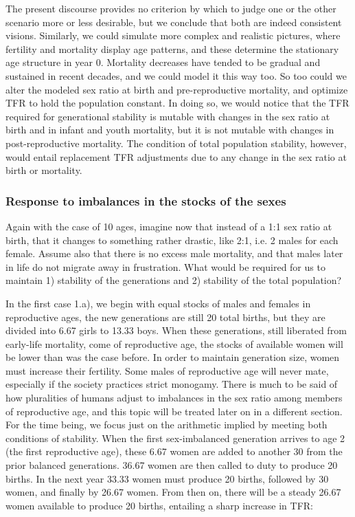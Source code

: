 \documentclass[reqno,12pt,oneside,a4paper]{report} %
\theoremstyle{plain}
\theoremstyle{definition}
\theoremstyle{remark}
\numberwithin{theorem}{chapter}     %
\begin{document}
The present discourse provides no criterion by which to judge one or the other scenario more or less desirable, but we conclude that both are indeed consistent visions. Similarly, we could simulate more complex and realistic pictures, where fertility and mortality display age patterns, and these determine the stationary age structure in year 0. Mortality decreases have tended to be gradual and sustained in recent decades, and we could model it this way too. So too could we alter the modeled sex ratio at birth and pre-reproductive mortality, and optimize TFR to hold the population constant. In doing so, we would notice that the TFR required for generational stability is mutable with changes in the sex ratio at birth and in infant and youth mortality, but it is not mutable with changes in post-reproductive mortality. The condition of total population stability, however, would entail replacement TFR adjustments due to any change in the sex ratio at birth or mortality. 

		\subsubsection{Response to imbalances in the stocks of the sexes}

Again with the case of 10 ages, imagine now that instead of a 1:1 sex ratio at birth, that it changes to something rather drastic, like 2:1, i.e. 2 males for each female. Assume also that there is no excess male mortality, and that males later in life do not migrate away in frustration. What would be required for us to maintain 1) stability of the generations and 2) stability of the total population?

In the first case 1.a), we begin with equal stocks of males and females in reproductive ages, the new generations are still 20 total births, but they are divided into 6.67 girls to 13.33 boys. When these generations, still liberated from early-life mortality, come of reproductive age, the stocks of available women will be lower than was the case before. In order to maintain generation size, women must increase their fertility. Some males of reproductive age will never mate, especially if the society practices strict monogamy. There is much to be said of how pluralities of humans adjust to imbalances in the sex ratio among members of reproductive age, and this topic will be treated later on in a different section. For the time being, we focus just on the arithmetic implied by meeting both conditions of stability. When the first sex-imbalanced generation arrives to age 2 (the first reproductive age), these 6.67 women are added to another 30 from the prior balanced generations. 36.67 women are then called to duty to produce 20 births. In the next year 33.33 women must produce 20 births, followed by 30 women, and finally by 26.67 women. From then on, there will be a steady 26.67 women available to produce 20 births, entailing a sharp increase in TFR:
\end{document}
